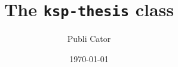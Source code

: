 \documentclass[
   layout=17x24,  %
   english,       %
]{ksp-thesis}
\begin{document}
\title{The \texttt{ksp-thesis} class}
\author{Publi Cator}
\date{\today}
\maketitle
\tableofcontents
\blinddocument
\end{document}
